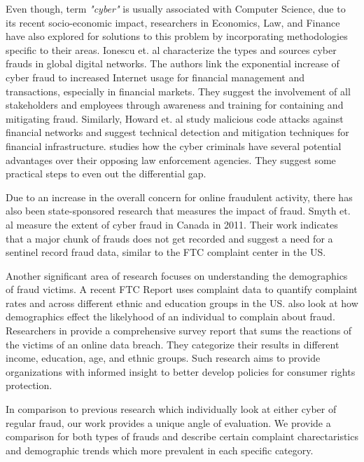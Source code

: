 \documentclass[conference]{IEEEtran}
\begin{document}
Even though, term \emph{"cyber"} is usually associated with Computer Science, due to its recent socio-economic impact, researchers in Economics, Law, and Finance have also explored for solutions to this problem by incorporating methodologies specific to their areas. Ionescu et. al \cite{fraudfinance} characterize the types and sources cyber frauds in global digital networks. The authors link the exponential increase of cyber fraud to increased Internet usage for financial management and transactions, especially in financial markets. They suggest the involvement of all stakeholders and employees through awareness and training for containing and mitigating fraud. Similarly, Howard et. al \cite{cybertrends} study malicious code attacks against financial networks and suggest technical detection and mitigation techniques for financial infrastructure. \cite{playingfield} studies how the cyber criminals have several potential advantages over their opposing law enforcement agencies. They suggest some practical steps to even out the differential gap.


Due to an increase in the overall concern for online fraudulent activity, there has also been state-sponsored research that measures the impact of fraud. Smyth et. al \cite{fraudcanada} measure the extent of cyber fraud in Canada in 2011. Their work indicates that a major chunk of frauds does not get recorded and suggest a need for a sentinel record fraud data, similar to the FTC complaint center in the US.

Another significant area of research focuses on understanding the demographics of fraud victims. A recent FTC Report \cite{ftccomplaints} uses complaint data to quantify complaint rates and across different ethnic and education groups in the US. \cite{consurmeraffairs} also look at how demographics effect the likelyhood of an individual to complain about fraud. Researchers in \cite{databreach} provide a comprehensive survey report that sums the reactions of the victims of an online data breach. They categorize their results in different income, education, age, and ethnic groups. Such research aims to provide organizations with informed insight to better develop policies for consumer rights protection.

In comparison to previous research which individually look at either cyber of regular fraud, our work provides a unique angle of evaluation. We provide a comparison for both types of frauds and describe certain complaint charectaristics and demographic trends which more prevalent in each specific category.
\end{document}
